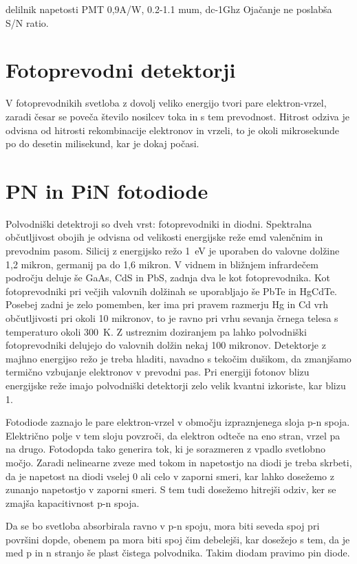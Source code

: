 delilnik napetosti
PMT 0,9A/W, 0.2-1.1 mum, dc-1Ghz
Ojačanje ne poslabša S/N ratio. 


\section{Fotoprevodni detektorji}
V fotoprevodnikih svetloba z dovolj veliko energijo tvori pare elektron-vrzel, zaradi  česar
se poveča število nosilcev toka in s tem prevodnost. Hitrost odziva je odvisna od hitrosti
rekombinacije elektronov in vrzeli, to je okoli mikrosekunde po do desetin milisekund, kar
je dokaj počasi. 

\section{PN in PiN fotodiode}
Polvodniški detektroji so dveh vrst: fotoprevodniki in diodni. Spektralna občutljivost
obojih je odvisna od velikosti energijske reže emd valenčnim in prevodnim pasom. Silicij
z energijsko režo 1~eV je uporaben do valovne dolžine 1,2 mikron, germanij pa do 1,6 mikron.
V vidnem in bližnjem infrardečem področju deluje še GaAs, CdS in PbS, zadnja dva le kot
fotoprevodnika. Kot fotoprevodniki pri večjih valovnih dolžinah se uporabljajo  še PbTe
in HgCdTe. Posebej zadni je zelo pomemben, ker ima pri pravem razmerju Hg in Cd vrh občutljivosti
pri okoli 10 mikronov, to je ravno pri vrhu sevanja črnega telesa s temperaturo okoli 300~K. 
Z ustreznim doziranjem pa lahko polvodniški fotoprevodniki delujejo do valovnih dolžin nekaj 100 mikronov.
Detektorje  z majhno energijso režo je treba hladiti, navadno s tekočim dušikom, da zmanjšamo
termično vzbujanje elektronov v prevodni pas. Pri energiji fotonov blizu energijske reže 
imajo polvodniški detektorji zelo velik kvantni izkoriste, kar blizu 1.

Fotodiode zaznajo le pare elektron-vrzel v območju izpraznjenega sloja p-n spoja. Električno 
polje v tem sloju povzroči, da elektron odteče na eno stran, vrzel pa na drugo. Fotodopda tako
generira tok, ki je sorazmeren z vpadlo svetlobno močjo. Zaradi nelinearne zveze med tokom in napetostjo
na diodi je treba skrbeti, da je napetost na diodi vselej 0 ali celo v zaporni smeri, kar lahko
dosežemo z zunanjo napetostjo v zaporni smeri. S tem tudi dosežemo hitrejši odziv, ker 
se zmajša kapacitivnost p-n spoja. 

Da se bo svetloba absorbirala ravno v p-n spoju, mora biti seveda spoj pri površini dopde, obenem
pa mora biti spoj čim debelejši, kar dosežejo s tem, da je med  p in n stranjo še plast
čistega polvodnika. Takim diodam pravimo pin diode. 

